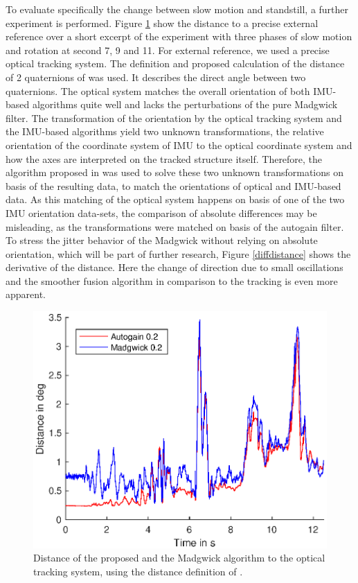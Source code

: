 \documentclass[letterpaper, 10 pt, conference]{ieeeconf}  %
\begin{document}
To evaluate specifically the change between slow motion and standstill, a further experiment is performed.
Figure \ref{distance} show the distance to a precise external reference over a short excerpt of the experiment with three phases of slow motion and rotation at second 7, 9 and 11. 
For external reference, we used a precise optical tracking system. 
The definition and proposed calculation of the distance of 2 quaternions of \cite{kuffner2004effectiveDistance} was used.
It describes the direct angle between two quaternions.
The optical system matches the overall orientation of both IMU-based algorithms quite well and lacks the perturbations of the pure Madgwick filter.
The transformation of the orientation by the optical tracking system and the IMU-based algorithms yield two unknown transformations, the relative orientation of the coordinate system of IMU to the optical coordinate system and how the axes are interpreted on the tracked structure itself.
Therefore, the algorithm proposed in \cite{dornaika1998calibration} was used to solve these two unknown transformations on basis of the resulting data, to match the orientations of optical and IMU-based data.
As this matching of the optical system happens on basis of one of the two IMU orientation data-sets, the comparison of absolute differences may be misleading, as the transformations were matched on basis of the autogain filter. 
To stress the jitter behavior of the Madgwick without relying on absolute orientation, which will be part of further research, Figure \ref{diffdistance} shows the derivative of the distance.
Here the change of direction due to small oscillations and the smoother fusion algorithm in comparison to the tracking is even more apparent.


\begin{figure}
\includegraphics[width=\linewidth]{./graphics/distance.eps}
\caption{Distance of the proposed and the Madgwick algorithm to the optical tracking system, using the distance definition of \cite{kuffner2004effectiveDistance}.}
\label{distance}
\end{figure}
\end{document}
